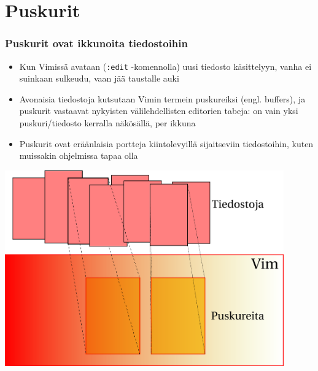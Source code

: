 \documentclass[]{beamer}
\newcommand{\Tohj}[1]{\texttt{#1}}
\newcommand{\com}[1]{{\color{blue!50!black}\Tohj{#1}} \!\!}
\begin{document}
\section {Puskurit}

\begin{frame}
    \frametitle{Puskurit ovat ikkunoita tiedostoihin}
    \begin{itemize}
        \item Kun Vimissä avataan (\com{:edit}-komennolla) uusi tiedosto käsittelyyn, vanha ei suinkaan sulkeudu, vaan jää taustalle auki
        \item Avonaisia tiedostoja kutsutaan Vimin termein puskureiksi (engl. buffers), ja puskurit vastaavat nykyisten välilehdellisten editorien tabeja: on vain yksi puskuri/tiedosto kerralla näkösällä, per ikkuna
        \pause
        \item Puskurit ovat eräänlaisia portteja kiintolevyillä sijaitseviin tiedostoihin, kuten muissakin ohjelmissa tapaa olla
    \end{itemize}
\end{frame}

\begin{frame}
    \includegraphics[width=0.9\textwidth]{puskurit}
\end{frame}
\end{document}
